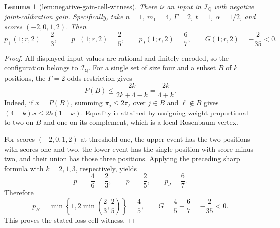 \documentclass{article}
\newtheorem{lemma}{Lemma}
\begin{document}
\begin{lemma}[lem:negative-gain-cell-witness]\label{lem:negative-gain-cell-witness}
There is an input in \(\mathcal I_{\mathbb Q}\) with negative joint-calibration gain. Specifically, take \(n=1\), \(m_1=4\), \(\Gamma=2\), \(t=1\), \(\alpha=1/2\), and scores \((-2,0,1,2)\). Then \[p_+(1;r,2)=\frac23,\qquad p_-(1;r,2)=\frac25,\qquad p_J(1;r,2)=\frac67,\qquad G(1;r,2)=-\frac{2}{35}<0.\]
\end{lemma}
\begin{proof}
All displayed input values are rational and finitely encoded, so the configuration belongs to \(\mathcal I_{\mathbb Q}\). For a single set of size four and a subset \(B\) of \(k\) positions, the \(\Gamma=2\) odds restriction gives
\[P(B)\le\frac{2k}{2k+4-k}=\frac{2k}{4+k}.\]
Indeed, if \(x=P(B)\), summing \(\pi_j\le2\pi_\ell\) over \(j\in B\) and \(\ell\notin B\) gives \((4-k)x\le2k(1-x)\). Equality is attained by assigning weight proportional to two on \(B\) and one on its complement, which is a local Rosenbaum vertex.

For scores \((-2,0,1,2)\) at threshold one, the upper event has the two positions with scores one and two, the lower event has the single position with score minus two, and their union has those three positions. Applying the preceding sharp formula with \(k=2,1,3\), respectively, yields
\[p_+=\frac{4}{6}=\frac23,\qquad p_-=\frac25,\qquad p_J=\frac67.\]
Therefore
\[p_B=\min\left\{1,2\min\left(\frac23,\frac25\right)\right\}=\frac45,\qquad G=\frac45-\frac67=-\frac{2}{35}<0.\]
This proves the stated loss-cell witness.
\end{proof}
\end{document}
